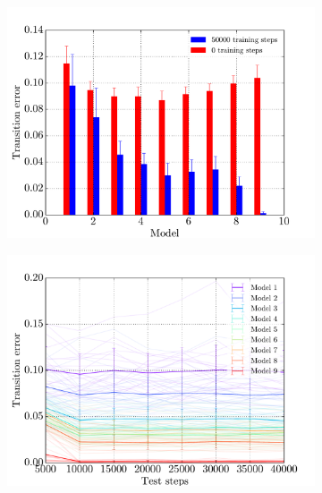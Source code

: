 \begin{figure}[p]
    \centering
    \begin{subfigure}{0.48\textwidth}
    	\centering
        \includegraphics[width=\textwidth]{results/mc2_performance_distances}
        \caption{}
        \label{fig:mc2-performance-distance}
    \end{subfigure}
    \hfill
    \begin{subfigure}{0.48\textwidth}
    	\centering
        \includegraphics[width=\textwidth]{results/mc2_test_traces_distances}
        \caption{}
        \label{fig:mc2-trace-distance}
    \end{subfigure}
    \begin{subfigure}{0.48\textwidth}

\end{subfigure}
\end{figure}
